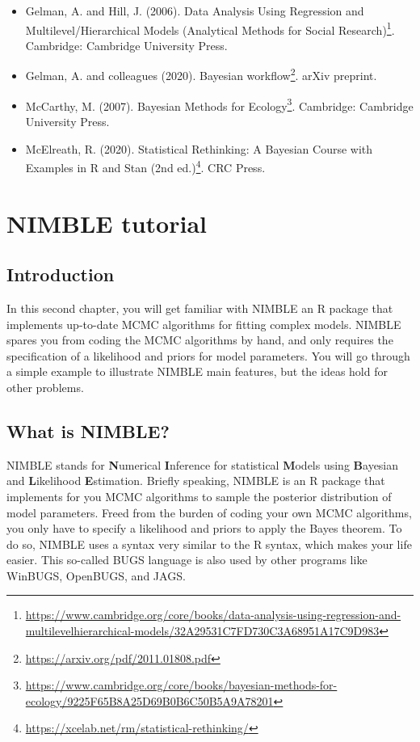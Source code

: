 \documentclass[
  12pt,
]{krantz}
\renewcommand{\href}[2]{#2\footnote{\url{#1}}}
\begin{document}
\begin{itemize}
\item
  Gelman, A. and Hill, J. (2006). \href{https://www.cambridge.org/core/books/data-analysis-using-regression-and-multilevelhierarchical-models/32A29531C7FD730C3A68951A17C9D983}{Data Analysis Using Regression and Multilevel/Hierarchical Models (Analytical Methods for Social Research)}. Cambridge: Cambridge University Press.
\item
  Gelman, A. and colleagues (2020). \href{https://arxiv.org/pdf/2011.01808.pdf}{Bayesian workflow}. arXiv preprint.
\item
  McCarthy, M. (2007). \href{https://www.cambridge.org/core/books/bayesian-methods-for-ecology/9225F65B8A25D69B0B6C50B5A9A78201}{Bayesian Methods for Ecology}. Cambridge: Cambridge University Press.
\item
  McElreath, R. (2020). \href{https://xcelab.net/rm/statistical-rethinking/}{Statistical Rethinking: A Bayesian Course with Examples in R and Stan (2nd ed.)}. CRC Press.
\end{itemize}

\hypertarget{intronimble}{%
\chapter{NIMBLE tutorial}\label{intronimble}}

\hypertarget{introduction-2}{%
\section{Introduction}\label{introduction-2}}

In this second chapter, you will get familiar with NIMBLE an R package that implements up-to-date MCMC algorithms for fitting complex models. NIMBLE spares you from coding the MCMC algorithms by hand, and only requires the specification of a likelihood and priors for model parameters. You will go through a simple example to illustrate NIMBLE main features, but the ideas hold for other problems.

\hypertarget{what-is-nimble}{%
\section{What is NIMBLE?}\label{what-is-nimble}}

NIMBLE stands for \textbf{N}umerical \textbf{I}nference for statistical \textbf{M}odels using \textbf{B}ayesian and \textbf{L}ikelihood \textbf{E}stimation. Briefly speaking, NIMBLE is an R package that implements for you MCMC algorithms to sample the posterior distribution of model parameters. Freed from the burden of coding your own MCMC algorithms, you only have to specify a likelihood and priors to apply the Bayes theorem. To do so, NIMBLE uses a syntax very similar to the R syntax, which makes your life easier. This so-called BUGS language is also used by other programs like WinBUGS, OpenBUGS, and JAGS.
\end{document}
